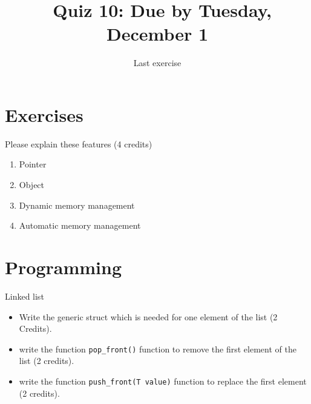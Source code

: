 \documentclass[11pt]{article}
\begin{document}
\title{\coursename~Quiz 10: Due by Tuesday, December 1}
\date{Last exercise}
\maketitle

\medskip


\section*{Exercises}
Please explain these features (4 credits)
\begin{enumerate}
\item Pointer
\item Object
\item Dynamic memory management 
\item Automatic memory management
\end{enumerate}

\section*{Programming}

Linked list
\begin{itemize}
\item Write the generic struct which is needed for one element of the list (2 Credits).
\item write the function \lstinline|pop_front()| function to remove the first element of the list (2 credits).
\item write the function \lstinline|push_front(T value)| function to replace the first element (2 credits).
\end{itemize}

\doclicenseThis 
\end{document}
